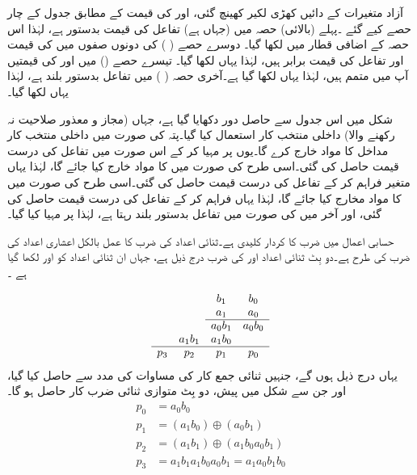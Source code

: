  آزاد متغیرات  کے دائیں کھڑی لکیر کھینچ گئی، اور  کی قیمت کے مطابق جدول کے چار حصے کیے گئے ۔پہلے (بالائی) حصہ میں (جہاں ہے) تفاعل  کی قیمت بدستور  ہے، لہٰذا اس حصہ کے اضافی قطار میں  لکھا گیا۔ دوسرے حصے ( ) کی دونوں صفوں میں  کی قیمت اور تفاعل  کی قیمت برابر ہیں، لہٰذا یہاں  لکھا گیا۔ تیسرے حصے () میں  اور  کی قیمتیں آپ میں متمم ہیں، لہٰذا یہاں  لکھا گیا ہے۔آخری حصہ ( ) میں تفاعل بدستور بلند ہے، لہٰذا یہاں  لکھا گیا۔


شکل  میں اس جدول سے حاصل دور دکھایا گیا ہے، جہاں (مجاز و معذور صلاحیت نہ رکھنے والا)  داخلی منتخب کار استعمال کیا گیا۔پتہ  کی صورت میں داخلی منتخب کار مداخل  کا مواد خارج کرے گا۔یوں  پر  مہیا کر کے اس صورت میں تفاعل کی درست قیمت حاصل کی گئی۔اسی طرح  کی صورت میں  کا مواد خارج کیا جائے گا، لہٰذا یہاں متغیر  فراہم کر کے تفاعل کی درست قیمت حاصل کی گئی۔اسی طرح  کی صورت میں  کا مواد مخارج کیا جائے گا، لہٰذا یہاں  فراہم کر کے تفاعل کی درست قیمت حاصل کی گئی، اور آخر میں  کی صورت میں تفاعل بدستور بلند رہتا ہے، لہٰذا  پر  مہیا کیا گیا۔


حسابی اعمال میں ضرب کا کردار کلیدی ہے۔ثنائی اعداد کی ضرب کا عمل بالکل اعشاری اعداد کی ضرب کی طرح ہے۔دو بِٹ ثنائی اعداد  اور  کی ضرب درج ذیل ہے، جہاں ان ثنائی اعداد کو  اور  لکھا گیا ہے ۔

\begin{align*}
\begin{array}{cccc}
&& b_1&b_0\\
&& a_1&a_0\\
\cline{3-4}
&& a_0b_1&a_0b_0\\
&a_1b_1&a_1b_0&\\
\cline{1-4}
p_3&p_2&p_1&p_0
\end{array}
\end{align*}
یہاں درج ذیل ہوں گے، جنہیں ثنائی جمع کار کی مساوات  کی مدد سے حاصل کیا گیا، اور جن سے شکل  میں پیش، دو بِٹ متوازی ثنائی ضرب کار حاصل ہو گا۔
\begin{align*}
p_0&=a_0b_0\\
p_1&=(a_1b_0)\oplus(a_0b_1)\\
p_2&=(a_1b_1)\oplus(a_1b_0a_0b_1)\\
p_3&=a_1b_1a_1b_0a_0b_1=a_1a_0b_1b_0
\end{align*}



